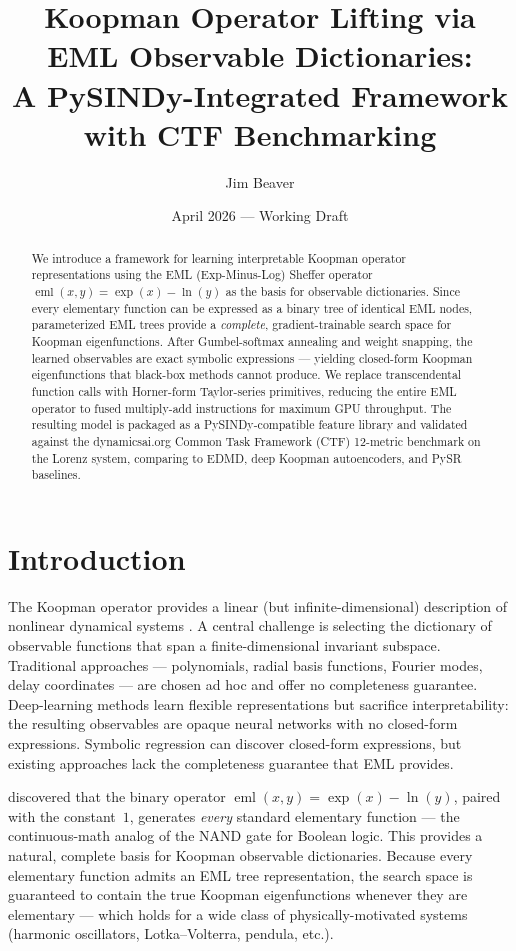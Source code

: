 \documentclass[11pt]{article}
\title{Koopman Operator Lifting via EML Observable Dictionaries:\\
A PySINDy-Integrated Framework with CTF Benchmarking}
\author{Jim Beaver}
\date{April 2026 --- Working Draft}
\DeclareMathOperator{\eml}{eml}
\begin{document}
\maketitle

\begin{abstract}
We introduce a framework for learning interpretable Koopman operator
representations using the EML (Exp-Minus-Log) Sheffer operator
$\eml(x,y) = \exp(x) - \ln(y)$ as the basis for observable dictionaries.
Since every elementary function can be expressed as a binary tree of identical
EML nodes, parameterized EML trees provide a \emph{complete}, gradient-trainable
search space for Koopman eigenfunctions.  After Gumbel-softmax annealing and
weight snapping, the learned observables are exact symbolic expressions ---
yielding closed-form Koopman eigenfunctions that black-box methods cannot produce.
We replace transcendental function calls with Horner-form Taylor-series primitives,
reducing the entire EML operator to fused multiply-add instructions for maximum GPU
throughput.  The resulting model is packaged as a PySINDy-compatible feature library
and validated against the dynamicsai.org Common Task Framework (CTF) 12-metric
benchmark on the Lorenz system, comparing to EDMD, deep Koopman autoencoders, and
PySR baselines.
\end{abstract}

\section{Introduction}
\label{sec:intro}

The Koopman operator provides a linear (but infinite-dimensional) description of
nonlinear dynamical systems \citep{koopman1931,mezic2005,budisic2012}.  A central challenge is selecting
the dictionary of observable functions that span a finite-dimensional invariant
subspace.  Traditional approaches --- polynomials, radial basis functions, Fourier
modes, delay coordinates --- are chosen ad hoc and offer no completeness guarantee.
Deep-learning methods \citep{takeishi2017,lusch2018} learn flexible representations
but sacrifice interpretability: the resulting observables are opaque neural
networks with no closed-form expressions.  Symbolic regression
\citep{schmidt2009,cranmer2023} can discover closed-form expressions, but existing
approaches lack the completeness guarantee that EML provides.

\citet{odrzywołek2026} discovered that the binary operator
$\eml(x,y) = \exp(x) - \ln(y)$, paired with the constant~$1$, generates
\emph{every} standard elementary function --- the continuous-math analog of the NAND
gate \citep{sheffer1913} for Boolean logic.  This provides a natural, complete basis for Koopman
observable dictionaries.  Because every elementary function admits an EML tree
representation, the search space is guaranteed to contain the true Koopman
eigenfunctions whenever they are elementary --- which holds for a wide class of
physically-motivated systems (harmonic oscillators, Lotka--Volterra, pendula, etc.).
\end{document}
